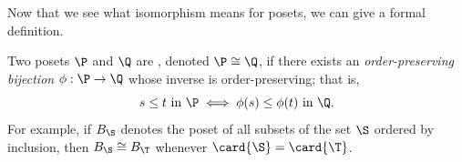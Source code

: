 Now that we see what isomorphism means for posets, we can give a formal
definition.
\begin{definition}
Two posets $\P$ and $\Q$ are , denoted $\P \cong \Q$, if
there exists an \emph{order-preserving bijection} $\phi : \P \to \Q$ whose
inverse is order-preserving; that is, $$s \leq t~\text{in}~\P \iff \phi(s) \leq
\phi(t)~\text{in}~\Q.$$ For example, if $B_{\S}$ denotes the poset of all subsets
of the set $\S$ ordered by inclusion, then $B_{\S} \cong B_{\T}$ whenever $\card{\S} =
\card{\T}$.
\end{definition}
